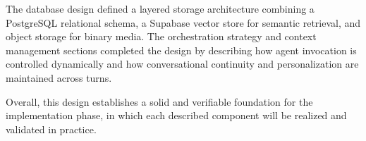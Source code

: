The database design defined a layered storage architecture combining a PostgreSQL relational schema, a Supabase vector store for semantic retrieval, and object storage for binary media. The orchestration strategy and context management sections completed the design by describing how agent invocation is controlled dynamically and how conversational continuity and personalization are maintained across turns.

Overall, this design establishes a solid and verifiable foundation for the implementation phase, in which each described component will be realized and validated in practice.
